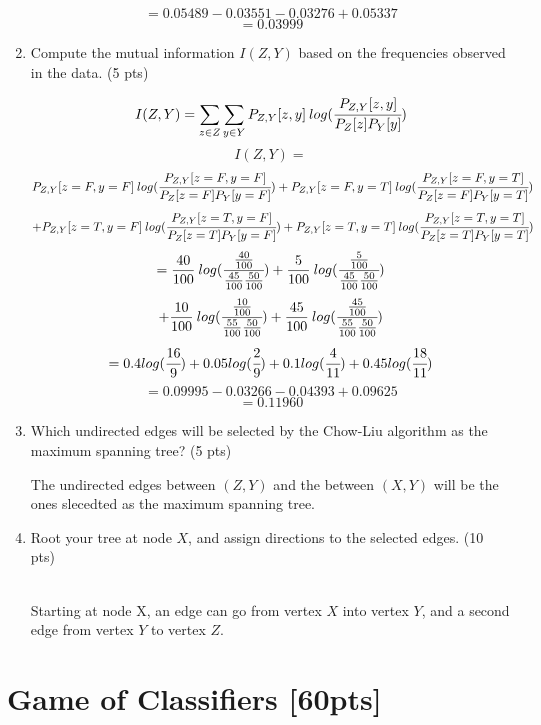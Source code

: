 \documentclass[a4paper]{article}
\theoremstyle{definition}
\newenvironment{soln}{
    \leavevmode\color{blue}\ignorespaces
}{}
\begin{document}
\begin{enumerate}
\begin{soln}
        \[  = 0.05489 - 0.03551 - 0.03276 + 0.05337\]
        \[  = 0.03999 \]
    \end{soln}
	\item Compute the mutual information $I(Z, Y)$ based on the frequencies observed in the data. (5 pts)
	\begin{soln}
        \[  I(Z, Y) = \sum_{z \in Z} \sum_{y \in Y} P_{Z,Y}[z, y]\:log(\cfrac{P_{Z,Y}[z, y]}{P_Z[z]P_Y[y]})  \]
        \[  I(Z, Y) = \]
        \[ P_{Z,Y}[z=F, y=F]\:log(\cfrac{P_{Z,Y}[z=F, y=F]}{P_Z[z=F]P_Y[y=F]}) + P_{Z,Y}[z=F, y=T]\:log(\cfrac{P_{Z,Y}[z=F, y=T]}{P_Z[z=F]P_Y[y=T]})\]
        \[  + P_{Z,Y}[z=T, y=F]\:log(\cfrac{P_{Z,Y}[z=T, y=F]}{P_Z[z=T]P_Y[y=F]}) + P_{Z,Y}[z=T, y=T]\:log(\cfrac{P_{Z,Y}[z=T, y=T]}{P_Z[z=T]P_Y[y=T]})\]
        \[  = \frac{40}{100}\:log(\cfrac{\frac{40}{100}}{\frac{45}{100}\frac{50}{100}}) + \frac{5}{100}\:log(\cfrac{\frac{5}{100}}{\frac{45}{100}\frac{50}{100}})\]
        \[  + \frac{10}{100}\:log(\cfrac{\frac{10}{100}}{\frac{55}{100}\frac{50}{100}}) + \frac{45}{100}\:log(\cfrac{\frac{45}{100}}{\frac{55}{100}\frac{50}{100}})\]
        \[  = 0.4log(\cfrac{16}{9}) + 0.05log(\cfrac{2}{9}) + 0.1log(\cfrac{4}{11}) + 0.45log(\cfrac{18}{11}) \]
        \[  = 0.09995 - 0.03266 - 0.04393 +  0.09625\]
        \[  = 0.11960 \]
    \end{soln}
	\item Which undirected edges will be selected by the Chow-Liu algorithm as the maximum spanning tree? (5 pts)
	\begin{soln}
        The undirected edges between $(Z, Y)$ and the between $(X, Y)$ will be the ones slecedted as the maximum spanning tree.
    \end{soln}
	\item Root your tree at node $X$, and assign directions to the selected edges. (10 pts)
	\begin{soln}
        \\Starting at node X, an edge can go from vertex $X$ into vertex $Y$, and a second edge from vertex $Y$ to vertex $Z$.
    \end{soln}
\end{enumerate}

\section{Game of Classifiers [60pts]}
\end{document}
